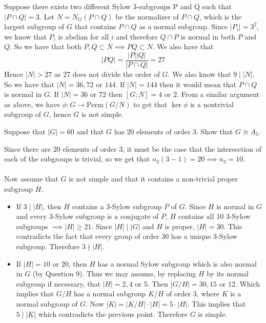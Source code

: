 \documentclass[12pt, answers]{exam}
\begin{document}
\begin{questions}
\begin{solution}
\begin{itemize}
                Suppose there exists two different Sylow 3-subgroups P and Q such that $|P \cap Q| = 3$. Let $N = N_G(P \cap Q)$ be the normalizer of $P \cap Q$, which is the largest subgroup of $G$ that contains $P \cap Q$ as a normal subgroup. Since $|P_i| = 3^2$, we know that $P_i$ is abelian for all $i$ and therefore $Q \cap P$ is normal in both $P$ and $Q$. So we have that both $P, Q \subset N \implies PQ \subset N$. We also have that
                \[ |PQ| = \frac{|P||Q|}{|P \cap Q|} = 27 \]
                Hence $|N| > 27$ as 27 does not divide the order of $G$. We also know that $9 \mathrel{|} |N|$. So we have that $|N| = 36, 72$ or $144$. If $|N| = 144$ then it would mean that $P \cap Q$ is normal in $G$. If $|N| = 36$ or $72$ then $[G \colon N] = 4$ or $2$. From a similar argument as above, we have $\phi\colon G \to \text{Perm}(G/N)$ to get that $\ker\phi$ is a nontrivial subgroup of $G$, hence $G$ is not simple.
            \end{itemize}
        \end{solution}
        \setcounter{question}{4}
        \question Suppose that $|G| = 60$ and that $G$ has 20 elements of order 3. Show that $G\cong A_5$.
        \begin{solution}
            Since there are 20 elements of order 3, it must be the case that the intersection of each of the subgroups is
            trivial, so we get that $n_3(3 - 1) = 20 \implies n_3 = 10$. \\ \\
            Now assume that $G$ is not simple and that it contains a non-trivial proper subgroup $H$.
            \begin{itemize}
                \item If $3 \mathrel{|} |H|$, then $H$ contains a $3$-Sylow subgroup $P$ of $G$. Since $H$ is normal in $G$
                      and every $3$-Sylow subgroup is a conjugate of $P$, $H$ contains all 10 3-Sylow subgroups
                      $\implies |H| \ge 21$. Since $|H| \mathrel{|} |G|$ and $H$ is proper, $|H| = 30$. This contradicts
                      the fact that every group of order 30 has a unique 3-Sylow subgroup. Therefore $3 \mathrel{\nmid} |H|$.
                \item If $|H| = 10$ or $20$, then $H$ has a normal Sylow subgroup which is also normal in $G$ (by Question 9).
                    Thus we may assume, by replacing $H$ by its normal subgroup if necessary, that $|H| = 2, 4$ or 5. Then
                    $|G / H| = 30, 15$ or 12. Which implies that $G / H$ has a normal subgroup $K / H$ of order 3, where
                    $K$ is a normal subgroup of $G$. Now $|K| = |K / H| \cdot |H| = 5 \cdot |H|$. This implies that
                    $5 \mathrel{|} |K|$ which contradicts the previous point. Therefore $G$ is simple.
            \end{itemize}
        \end{solution}


\end{questions}
\end{document}
